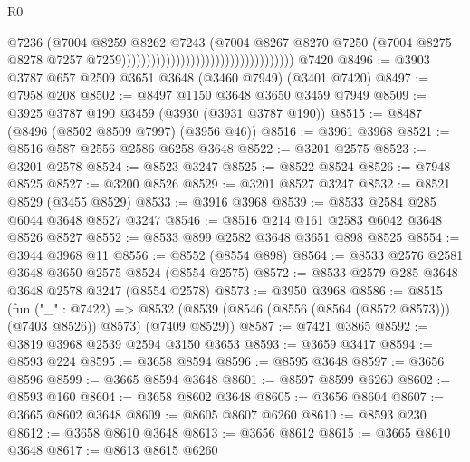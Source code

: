 \begin{lexlean}{R0}
\begin{coremodule}
                                                                    @7236
                                                                    (@7004
                                                                      @8259
                                                                      @8262
                                                                      @7243
                                                                      (@7004
                                                                        @8267
                                                                        @8270
                                                                        @7250
                                                                        (@7004
                                                                          @8275
                                                                          @8278
                                                                          @7257
                                                                          @7259)))))))))))))))))))))))))))))))))))
    @7420
@8496 := @3903 @3787 @657 @2509 @3651 @3648 (@3460 @7949) (@3401 @7420)
@8497 := @7958 @208
@8502 := @8497 @1150 @3648 @3650 @3459 @7949
@8509 := @3925 @3787 @190 @3459 (@3930 (@3931 @3787 @190))
@8515 := @8487 (@8496 (@8502 @8509 @7997) (@3956 @46))
@8516 := @3961 @3968
@8521 := @8516 @587 @2556 @2586 @6258 @3648
@8522 := @3201 @2575
@8523 := @3201 @2578
@8524 := @8523 @3247
@8525 := @8522 @8524
@8526 := @7948 @8525
@8527 := @3200 @8526
@8529 := @3201 @8527 @3247
@8532 := @8521 @8529 (@3455 @8529)
@8533 := @3916 @3968
@8539 := @8533 @2584 @285 @6044 @3648 @8527 @3247
@8546 := @8516 @214 @161 @2583 @6042 @3648 @8526 @8527
@8552 := @8533 @899 @2582 @3648 @3651 @898 @8525
@8554 := @3944 @3968 @11
@8556 := @8552 (@8554 @898)
@8564 := @8533 @2576 @2581 @3648 @3650 @2575 @8524 (@8554 @2575)
@8572 := @8533 @2579 @285 @3648 @3648 @2578 @3247 (@8554 @2578)
@8573 := @3950 @3968
@8586 := @8515
    (fun ("_" : @7422) =>
    @8532 (@8539 (@8546 (@8556 (@8564 (@8572 @8573))) (@7403 @8526)) @8573) (@7409 @8529))
@8587 := @7421 @3865
@8592 := @3819 @3968 @2539 @2594 @3150 @3653
@8593 := @3659 @3417
@8594 := @8593 @224
@8595 := @3658 @8594
@8596 := @8595 @3648
@8597 := @3656 @8596
@8599 := @3665 @8594 @3648
@8601 := @8597 @8599 @6260
@8602 := @8593 @160
@8604 := @3658 @8602 @3648
@8605 := @3656 @8604
@8607 := @3665 @8602 @3648
@8609 := @8605 @8607 @6260
@8610 := @8593 @230
@8612 := @3658 @8610 @3648
@8613 := @3656 @8612
@8615 := @3665 @8610 @3648
@8617 := @8613 @8615 @6260

\end{coremodule}
\end{lexlean}
